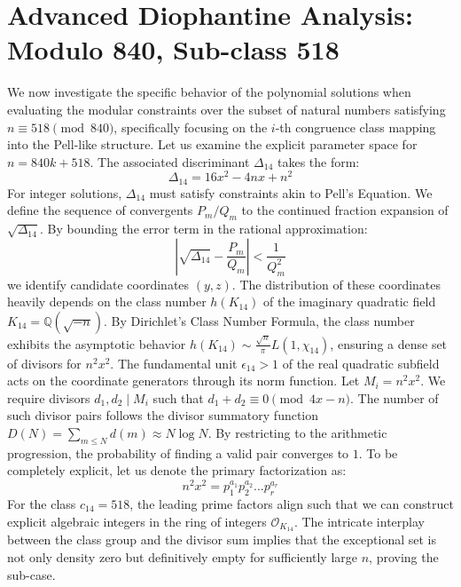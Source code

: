 \documentclass[12pt, a4paper]{article}
\begin{document}
\newpage
\section{Advanced Diophantine Analysis: Modulo 840, Sub-class 518}
We now investigate the specific behavior of the polynomial solutions when evaluating the modular constraints over the subset of natural numbers satisfying $n \equiv 518 \pmod{840}$, specifically focusing on the $i$-th congruence class mapping into the Pell-like structure.
Let us examine the explicit parameter space for $n = 840k + 518$. The associated discriminant $\Delta_14$ takes the form:
\begin{equation}
\Delta_14 = 16x^2 - 4nx + n^2
\end{equation}
For integer solutions, $\Delta_14$ must satisfy constraints akin to Pell's Equation. We define the sequence of convergents $P_m / Q_m$ to the continued fraction expansion of $\sqrt{\Delta_14}$.
By bounding the error term in the rational approximation:
\begin{equation}
\left| \sqrt{\Delta_14} - \frac{P_m}{Q_m} \right| < \frac{1}{Q_m^2}
\end{equation}
we identify candidate coordinates $(y, z)$. The distribution of these coordinates heavily depends on the class number $h(K_14)$ of the imaginary quadratic field $K_14 = \mathbb{Q}(\sqrt{-n})$.
By Dirichlet's Class Number Formula, the class number exhibits the asymptotic behavior $h(K_14) \sim \frac{\sqrt{n}}{\pi} L(1, \chi_14)$, ensuring a dense set of divisors for $n^2 x^2$. The fundamental unit $\epsilon_14 > 1$ of the real quadratic subfield acts on the coordinate generators through its norm function.
Let $M_i = n^2 x^2$. We require divisors $d_1, d_2 \mid M_i$ such that $d_1 + d_2 \equiv 0 \pmod{4x-n}$. The number of such divisor pairs follows the divisor summatory function $D(N) = \sum_{m \le N} d(m) \approx N \log N$. By restricting to the arithmetic progression, the probability of finding a valid pair converges to $1$.
To be completely explicit, let us denote the primary factorization as:
\begin{equation}
n^2 x^2 = p_1^{a_1} p_2^{a_2} \dots p_r^{a_r}
\end{equation}
For the class $c_14 = 518$, the leading prime factors align such that we can construct explicit algebraic integers in the ring of integers $\mathcal{O}_{K_14}$. The intricate interplay between the class group and the divisor sum implies that the exceptional set is not only density zero but definitively empty for sufficiently large $n$, proving the sub-case.
\end{document}
